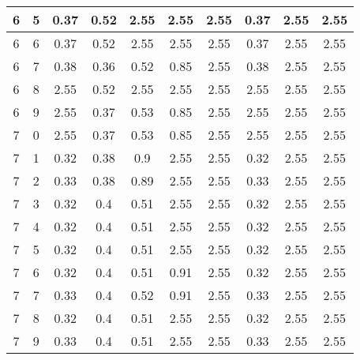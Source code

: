 \begin{longtable}{|c|c||c||c|c|c|c||c|c|c|}
	6 & 5 & 0.37 & 0.52 & 2.55 & 2.55 & 2.55 & 0.37 & 2.55 & 2.55 \\ \hline
	6 & 6 & 0.37 & 0.52 & 2.55 & 2.55 & 2.55 & 0.37 & 2.55 & 2.55 \\ \hline
	6 & 7 & 0.38 & 0.36 & 0.52 & 0.85 & 2.55 & 0.38 & 2.55 & 2.55 \\ \hline
	6 & 8 & 2.55 & 0.52 & 2.55 & 2.55 & 2.55 & 2.55 & 2.55 & 2.55 \\ \hline
	6 & 9 & 2.55 & 0.37 & 0.53 & 0.85 & 2.55 & 2.55 & 2.55 & 2.55 \\ \hline
	7 & 0 & 2.55 & 0.37 & 0.53 & 0.85 & 2.55 & 2.55 & 2.55 & 2.55 \\ \hline
	7 & 1 & 0.32 & 0.38 & 0.9 & 2.55 & 2.55 & 0.32 & 2.55 & 2.55 \\ \hline
	7 & 2 & 0.33 & 0.38 & 0.89 & 2.55 & 2.55 & 0.33 & 2.55 & 2.55 \\ \hline
	7 & 3 & 0.32 & 0.4 & 0.51 & 2.55 & 2.55 & 0.32 & 2.55 & 2.55 \\ \hline
	7 & 4 & 0.32 & 0.4 & 0.51 & 2.55 & 2.55 & 0.32 & 2.55 & 2.55 \\ \hline
	7 & 5 & 0.32 & 0.4 & 0.51 & 2.55 & 2.55 & 0.32 & 2.55 & 2.55 \\ \hline
	7 & 6 & 0.32 & 0.4 & 0.51 & 0.91 & 2.55 & 0.32 & 2.55 & 2.55 \\ \hline
	7 & 7 & 0.33 & 0.4 & 0.52 & 0.91 & 2.55 & 0.33 & 2.55 & 2.55 \\ \hline
	7 & 8 & 0.32 & 0.4 & 0.51 & 2.55 & 2.55 & 0.32 & 2.55 & 2.55 \\ \hline
	7 & 9 & 0.33 & 0.4 & 0.51 & 2.55 & 2.55 & 0.33 & 2.55 & 2.55 \\ \hline
\end{longtable}
\clearpage{}
